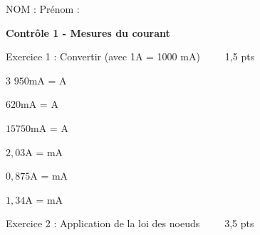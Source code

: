 \documentclass[11pt,a4paper]{article}
\begin{document}
\begin{mybox1}
NOM : \hfill Prénom : \hfill ~~
\end{mybox1}

\vfill
\begin{mybox}
\begin{center}
\textbf{\Large Contrôle 1 - Mesures du courant}
\end{center}
\end{mybox}

\vfill 

\begin{mybox1}
Exercice 1 : Convertir (avec 1A = 1000 mA) ~ \hfill ~~ 1,5 pts
\end{mybox1}

\vspace{3mm}

\begin{multicols}{3}
$950$mA = \dotfill A 
\vspace{5mm}

$620$mA = \dotfill A 
\vspace{5mm}

$15750$mA = \dotfill A 
\vspace{5mm}

$2,03$A = \dotfill mA
\vspace{5mm}

$0,875$A = \dotfill mA
\vspace{5mm}

$1,34$A = \dotfill mA
\vspace{5mm}
\end{multicols}

\begin{mybox1}
Exercice 2 : Application de la loi des noeuds ~ \hfill ~~ 3,5 pts
\end{mybox1}
\end{document}
